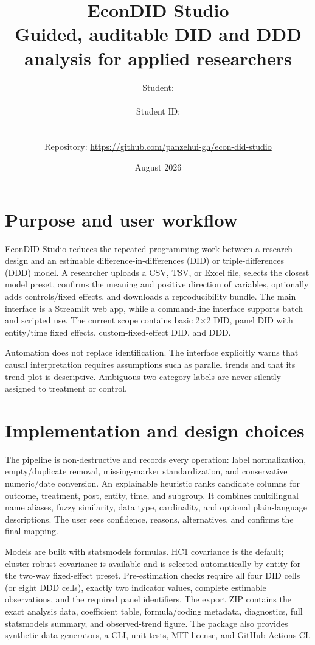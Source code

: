 \documentclass[9pt,a4paper]{article}
\title{\vspace{-12mm}\textbf{EconDID Studio}\\[-1mm]
\large Guided, auditable DID and DDD analysis for applied researchers}
\author{Student: \rule{32mm}{0.4pt} \quad Student ID: \rule{28mm}{0.4pt}\\
Repository: \url{https://github.com/panzehui-gh/econ-did-studio}}
\date{August 2026}
\begin{document}
\maketitle
\vspace{-6mm}

\section*{Purpose and user workflow}
EconDID Studio reduces the repeated programming work between a research design
and an estimable difference-in-differences (DID) or triple-differences (DDD)
model. A researcher uploads a CSV, TSV, or Excel file, selects the closest model
preset, confirms the meaning and positive direction of variables, optionally
adds controls/fixed effects, and downloads a reproducibility bundle. The main
interface is a Streamlit web app, while a command-line interface supports batch
and scripted use. The current scope contains basic 2$\times$2 DID, panel DID with
entity/time fixed effects, custom-fixed-effect DID, and DDD.

Automation does not replace identification. The interface explicitly warns that
causal interpretation requires assumptions such as parallel trends and that its
trend plot is descriptive. Ambiguous two-category labels are never silently
assigned to treatment or control.

\section*{Implementation and design choices}
The pipeline is non-destructive and records every operation: label
normalization, empty/duplicate removal, missing-marker standardization, and
conservative numeric/date conversion. An explainable heuristic ranks candidate
columns for outcome, treatment, post, entity, time, and subgroup. It combines
multilingual name aliases, fuzzy similarity, data type, cardinality, and optional
plain-language descriptions. The user sees confidence, reasons, alternatives,
and confirms the final mapping.

Models are built with statsmodels formulas. HC1 covariance is the default;
cluster-robust covariance is available and is selected automatically by entity
for the two-way fixed-effect preset. Pre-estimation checks require all four DID
cells (or eight DDD cells), exactly two indicator values, complete estimable
observations, and the required panel identifiers. The export ZIP contains the
exact analysis data, coefficient table, formula/coding metadata, diagnostics,
full statsmodels summary, and observed-trend figure. The package also provides
synthetic data generators, a CLI, unit tests, MIT license, and GitHub Actions CI.
\end{document}
